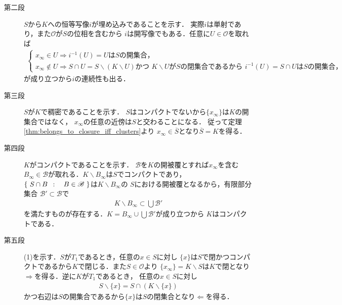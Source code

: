 \begin{prf}
\begin{description}
			\item[第二段] $S$から$K$への恒等写像$i$が埋め込みであることを示す．
				実際$i$は単射であり，また$\mathscr{O}$が$S$の位相を含むから
				$i$は開写像でもある．任意に$U \in \mathscr{O}$を取れば
				\begin{align}
					\begin{cases}
						x_\infty \in U \Longrightarrow 
						\mbox{$i^{-1}(U) = U$は$S$の開集合，} & \\
						x_\infty \notin U \Longrightarrow
						\mbox{$S \cap U = S \backslash (K \backslash U)$かつ
						$K \backslash U$が$S$の閉集合であるから
						$i^{-1}(U) = S \cap U$は$S$の開集合，}
					\end{cases}
				\end{align}
				が成り立つから$i$の連続性も出る．
				
			\item[第三段] $S$が$K$で稠密であることを示す．
				$S$はコンパクトでないから$\{x_\infty\}$は$K$の開集合ではなく，
				$x_\infty$の任意の近傍は$S$と交わることになる．
				従って定理\ref{thm:belongs_to_closure_iff_clusters}より
				$x_\infty \in \overline{S}$となり$\overline{S} = K$を得る．
				
			\item[第四段] $K$がコンパクトであることを示す．
				$\mathscr{B}$を$K$の開被覆とすれば$x_\infty$を含む
				$B_\infty \in \mathscr{B}$が取れる．$K \backslash B_\infty$は$S$でコンパクトであり，
				$\left\{\ S \cap B\ \, : \quad B \in \mathscr{B}\ \right\}$は$K \backslash B_\infty$の
				$S$における開被覆となるから，有限部分集合
				$\mathscr{B}' \subset \mathscr{B}$で
				\begin{align}
					K \backslash B_\infty \subset \bigcup \mathscr{B}'
				\end{align}
				を満たすものが存在する．$K = B_\infty \cup \bigcup \mathscr{B}'$が成り立つから
				$K$はコンパクトである．
				
			\item[第五段] (1)を示す．$S$が$T_1$であるとき，任意の$x \in S$に対し
				$\{x\}$は$S$で閉かつコンパクトであるから$K$で閉じる．また$S \in \mathscr{O}$より
				$\{x_\infty\} = K \backslash S$は$K$で閉となり
				$\Longrightarrow$を得る．逆に$K$が$T_1$であるとき，
				任意の$x \in S$に対し
				\begin{align}
					S \backslash \{x\} = S \cap (K \backslash \{x\})
				\end{align}
				かつ右辺は$S$の開集合であるから$\{x\}$は$S$の閉集合となり$\Longleftarrow$を得る．
			

\end{description}
\end{prf}
